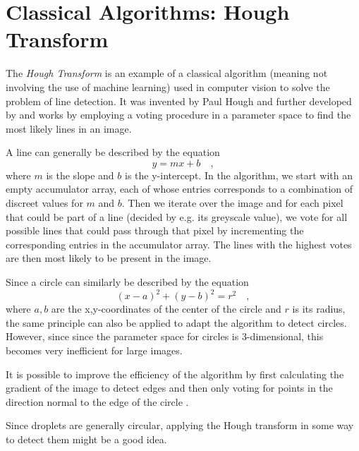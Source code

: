 \section{Classical Algorithms: Hough Transform}

The \emph{Hough Transform} is an example of a classical algorithm (meaning not involving the use of machine learning) used in computer vision to solve the problem of line detection.  
It was invented by Paul Hough \cite{houghMachineAnalysisBubble1959} and further developed by  \cite{dudaUseHoughTransformation1972} and works by employing a voting procedure in a parameter space to find the most likely lines in an image.

A line can generally be described by the equation 
$$
    y = mx + b\quad ,
$$
where $m$ is the slope and $b$ is the y-intercept. 
In the algorithm, we start with an empty accumulator array, each of whose entries corresponds to a combination of discreet values for $m$ and $b$.
Then we iterate over the image and for each pixel that could be part of a line (decided by e.g. its greyscale value), we vote for all possible lines that could pass through that pixel by incrementing the corresponding entries in the accumulator array.
The lines with the highest votes are then most likely to be present in the image.

Since a circle can similarly be described by the equation
$$
(x - a)^2 + (y - b)^2 = r^2\quad ,
$$
where $a,b$ are the x,y-coordinates of the center of the circle and $r$ is its radius, the same principle can also be applied to adapt the algorithm to detect circles.
However, since since the parameter space for circles is 3-dimensional, this becomes very inefficient for large images.

It is possible to improve the efficiency of the algorithm by first calculating the gradient of the image to detect edges and then only voting for points in the direction normal to the edge of the circle \cite{yuenComparativeStudyHough1989,kierkegaardMethodDetectionCircular1992}.

Since droplets are generally circular, applying the Hough transform in some way to detect them might be a good idea.